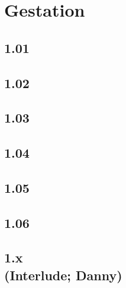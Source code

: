 \part{Gestation}

\chapter{1.01}



\chapter{1.02}



\chapter{1.03}



\chapter{1.04}



\chapter{1.05}



\chapter{1.06}



\chapter[1.x (Interlude; Danny)]{1.x\\(Interlude; Danny)}

